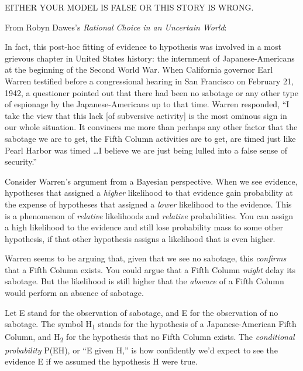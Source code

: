 {
 EITHER YOUR MODEL IS FALSE OR THIS STORY IS WRONG.}

\myendsectiontext


\bigskip


{
 From Robyn Dawes's \textit{Rational Choice in an
Uncertain World}:}

{
 In fact, this post-hoc fitting of evidence to hypothesis was
involved in a most grievous chapter in United States history: the
internment of Japanese-Americans at the beginning of the Second World
War. When California governor Earl Warren testified before a
congressional hearing in San Francisco on February 21, 1942, a
questioner pointed out that there had been no sabotage or any other
type of espionage by the Japanese-Americans up to that time. Warren
responded, ``I take the view that this lack [of
subversive activity] is the most ominous sign in our whole situation.
It convinces me more than perhaps any other factor that the sabotage we
are to get, the Fifth Column activities are to get, are timed just like
Pearl Harbor was timed \ldots I believe we are just being lulled into a
false sense of security.''}

{
 Consider Warren's argument from a Bayesian
perspective. When we see evidence, hypotheses that assigned a
\textit{higher} likelihood to that evidence gain probability at the
expense of hypotheses that assigned a \textit{lower} likelihood to the
evidence. This is a phenomenon of \textit{relative} likelihoods and
\textit{relative} probabilities. You can assign a high likelihood to
the evidence and still lose probability mass to some other hypothesis,
if that other hypothesis assigns a likelihood that is even higher.}

{
 Warren seems to be arguing that, given that we see no sabotage,
this \textit{confirms} that a Fifth Column exists. You could argue that
a Fifth Column \textit{might} delay its sabotage. But the likelihood is
still higher that the \textit{absence} of a Fifth Column would perform
an absence of sabotage.}

{
 Let E stand for the observation of sabotage, and {\textlnot}E for
the observation of no sabotage. The symbol H\textsubscript{1} stands
for the hypothesis of a Japanese-American Fifth Column, and
H\textsubscript{2} for the hypothesis that no Fifth Column exists. The
\textit{conditional probability} P(E{\textbar}H), or
``E given H,'' is how confidently
we'd expect to see the evidence E if we assumed the
hypothesis H were true.}


